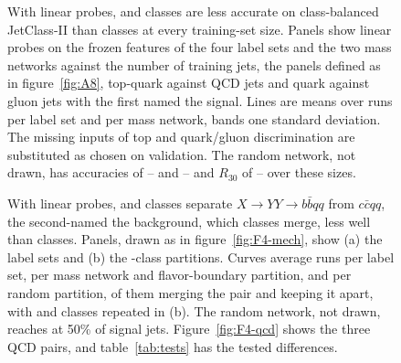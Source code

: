 

\begin{figure}[tbp]
\centering
{}
\caption{With linear probes, \Kmid{} and \Kcoarse{} classes are less accurate on class-balanced JetClass-II than
\Kfull{} classes at every training-set size. Panels show linear probes on the frozen features of the four label
sets and the two mass networks against the number of training jets, the panels defined as in
figure~\ref{fig:A8}, top-quark against QCD jets and quark against gluon jets with the first named the signal. Lines are means over \MlstNRunsWord{} runs per label set and \MlstMassNRunsWord{} per mass
network, bands one standard deviation. The missing inputs of top and quark/gluon discrimination are substituted as
chosen on validation. The random network, not drawn, has accuracies of
\MlstATenInitAccJcTwoMin{}--\MlstATenInitAccJcTwoMax{} and \MlstATenInitAccJcOneMin{}--\MlstATenInitAccJcOneMax{}
and $R_{30}$ of \MlstATenInitRthirtyMin{}--\MlstATenInitRthirtyMax{} over these sizes.}
\label{fig:A10}
\end{figure}









\begin{figure}[tbp]
\centering
{}
\caption{With linear probes, \Kmid{} and \Kcoarse{} classes separate $X\to YY\to b\bar bqq$ from $c\bar cqq$, the
second-named the background, which \Kcoarse{} classes merge, less well than \Kfull{} classes. Panels, drawn as in
figure~\ref{fig:F4-mech}, show (a) the label sets and (b) the \Kcoarse-class partitions. Curves average
\MlstNRunsWord{} runs per label set, \MlstMassNRunsWord{} per mass network and flavor-boundary partition, and
\RandVtwoRuns{} per random partition, \MlstPairRandMergedBbqqWord{} of them merging the pair and
\MlstPairRandApartBbqqWord{} keeping it apart, with \Kfull{} and \Kcoarse{} classes repeated in (b). The random
network, not drawn, reaches \MlstPairInitRhalfOtherMin{} at
50\% of signal jets. Figure~\ref{fig:F4-qcd} shows the three QCD pairs, and table~\ref{tab:tests} has the tested
differences.}
\label{fig:F4-other}
\end{figure}

